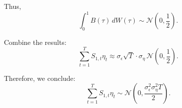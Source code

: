 \documentclass{article} %
\begin{document}
Thus,
\begin{equation}
 \int_{0}^{1} B(\tau) \, dW(\tau) \sim \mathcal{N}\left( 0, \frac{1}{2} \right).
\end{equation}

Combine the results:
\begin{equation}
 \sum_{t=1}^{T} S_{1,t} \eta_t \approx \sigma_{\epsilon} \sqrt{T} \cdot \sigma_{\eta}\, \mathcal{N}\left( 0, \frac{1}{2} \right).
\end{equation}

Therefore, we conclude:
\begin{equation}
 \sum_{t=1}^{T} S_{1,t} \eta_t \sim \mathcal{N}\left( 0, \frac{\sigma_{\epsilon}^2 \sigma_{\eta}^2 T}{2} \right).
\end{equation}
\end{document}
